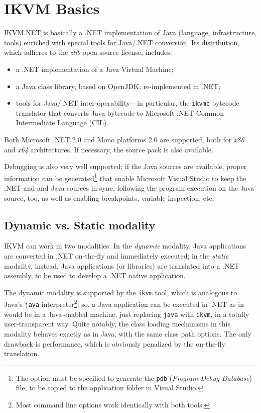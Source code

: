 \section{IKVM Basics}
\label{sec:dotnet-ikvm}

IKVM.NET \cite{ikvm} is basically a .NET implementation of Java (language, infrastructure, tools) enriched with special tools for Java/.NET conversion.
Its distribution, which adheres to the \textit{zlib} open source license, includes:
\begin{itemize}
  \item a .NET implementation of a Java Virtual Machine;
  \item a Java class library, based on OpenJDK, re-implemented in .NET;
  \item tools for Java/.NET inter-operability---in particular, the \texttt{ikvmc} bytecode translator that converts Java bytecode to Microsoft .NET Common Intermediate Language (CIL).
\end{itemize}

\noindent Both Microsoft .NET 2.0 and Mono platforms 2.0 are supported, both for \textit{x86} and \textit{x64} architectures. If necessary, the source pack is also available.

Debugging is also very well supported: if the Java sources are available, proper information can be generated\footnote{The option must be specified to generate the \texttt{pdb} (\textit{Program Debug Database}) file, to be copied to the application folder in Visual Studio.} that enable Microsoft Visual Studio to keep the .NET and and Java sources in sync, following the program execution on the Java source, too, as well as enabling breakpoints, variable inspection, etc.

\subsection{Dynamic vs. Static modality}
\label{ssec:ikvm-dynamic-static}

IKVM can work in two modalities. In the \textit{dynamic} modality, Java applications are converted in .NET on-the-fly and immediately executed; in the \textit{static} modality, instead, Java applications (or libraries) are translated into a .NET assembly, to be used to develop a .NET native application.

The dynamic modality is supported by the \texttt{ikvm} tool, which is analogous to Java's \texttt{java} interpreter\footnote{Most command line options work identically with both tools.}: so, a Java application can be executed in .NET as in would be in a Java-enabled machine, just replacing \texttt{java} with \texttt{ikvm}, in a totally user-transparent way.
Quite notably, the class loading mechanisms in this modality behaves exactly as in Java, with the same class path options.
The only drawback is performance, which is obviously penalized by the on-the-fly translation.


